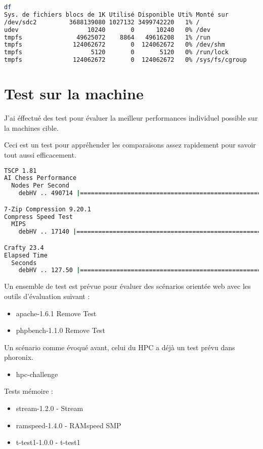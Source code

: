 \documentclass[french]{article}
\begin{document}
\begin{lstlisting}[language=bash,caption={df}]
df
Sys. de fichiers blocs de 1K Utilisé Disponible Uti% Monté sur
/dev/sdc2         3688139080 1027132 3499742220   1% /
udev                   10240       0      10240   0% /dev
tmpfs               49625072    8864   49616208   1% /run
tmpfs              124062672       0  124062672   0% /dev/shm
tmpfs                   5120       0       5120   0% /run/lock
tmpfs              124062672       0  124062672   0% /sys/fs/cgroup

\end{lstlisting}
\newpage
\section{Test sur la machine}
J'ai éffectué des test pour évaluer la meilleur performances individuel possible sur la machines cible. 

Ceci est un test pour appréhender les comparaisons assez rapidement pour savoir tout aussi efficacement.

\begin{lstlisting}[language=bash,caption={}]
TSCP 1.81
AI Chess Performance
  Nodes Per Second
    debHV .. 490714 |==========================================================

7-Zip Compression 9.20.1
Compress Speed Test
  MIPS
    debHV .. 17140 |===========================================================

Crafty 23.4
Elapsed Time
  Seconds
    debHV .. 127.50 |==========================================================


\end{lstlisting}

Un ensemble de test est prévue pour évaluer des scénarios orientée web avec les outils d'évaluation suivant : 

\begin{itemize}
\item apache-1.6.1 Remove Test
\item phpbench-1.1.0 Remove Test
\end{itemize}
Un scénario comme évoqué avant, celui du HPC a déjà un test prévu dans phoronix. 
\begin{itemize}
\item hpc-challenge
\end{itemize}

Tests mémoire : 
\begin{itemize}
                
\item stream-1.2.0                 - Stream                             
\item ramspeed-1.4.0               - RAMspeed SMP                       
\item t-test1-1.0.0                - t-test1  
\end{itemize}    
\newpage
\end{document}
